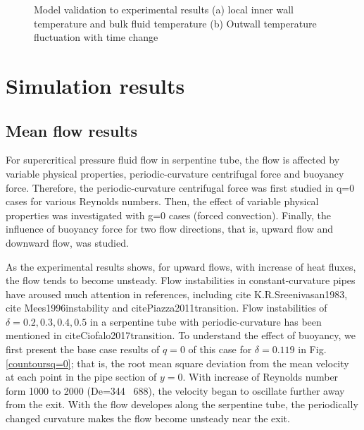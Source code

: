 \documentclass[a4paper,12pt]{article}
\begin{document}
\begin{figure}
	\centering
	\caption{Model validation to experimental results (a) local inner wall temperature and bulk fluid temperature (b) Outwall temperature fluctuation with time change}\label{Model validation}
\end{figure}



\section{Simulation results}
\subsection{Mean flow results}

For supercritical pressure fluid flow in serpentine tube, the flow is affected by variable physical properties, periodic-curvature centrifugal force and buoyancy force. Therefore, the periodic-curvature centrifugal force was first studied in q=0 cases for various Reynolds numbers. Then, the effect of variable physical properties was investigated with g=0 cases (forced convection). Finally, the influence of buoyancy force for two flow directions, that is, upward flow and downward flow, was studied.

As the experimental results shows, for upward flows, with increase of heat fluxes, the flow tends to become unsteady. Flow instabilities in constant-curvature pipes have aroused much attention in references, including cite {K.R.Sreenivasan1983}, cite {Mees1996instability} \cite{Travellingwaveinstabilities} and cite{Piazza2011transition}. Flow instabilities of $\delta=0.2,0.3,0.4,0.5$ in a serpentine tube with periodic-curvature has been mentioned in cite{Ciofalo2017transition}. To understand the effect of buoyancy, we first present the base case results of $q=0$ of this case for $\delta=0.119$ in Fig.\ref{countoursq=0}; that is, the root mean square deviation from the mean velocity at each point in the pipe section of $y=0$. With increase of Reynolds number form 1000 to 2000 (De=344 ~688), the velocity began to oscillate further away from the exit. With the flow developes along the serpentine tube, the periodically changed curvature makes the flow become unsteady near the exit.
\end{document}
